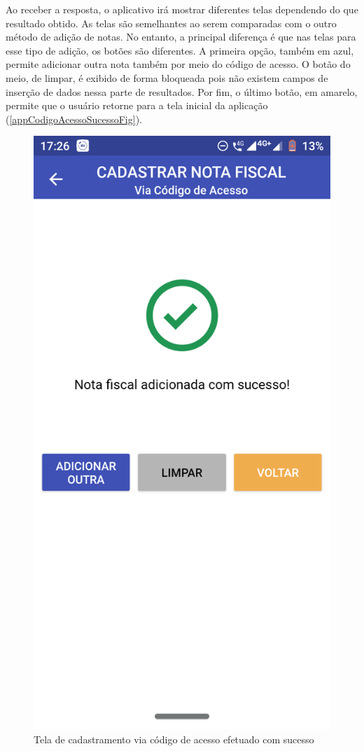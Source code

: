 Ao receber a resposta, o aplicativo irá mostrar diferentes telas dependendo do que resultado obtido. As telas são semelhantes ao serem comparadas com o outro método de adição de notas. No entanto, a principal diferença é que nas telas para esse tipo de adição, os botões são diferentes. A primeira opção, também em azul, permite adicionar outra nota também por meio do código de acesso. O botão do meio, de limpar, é exibido de forma bloqueada pois não existem campos de inserção de dados nessa parte de resultados. Por fim, o último botão, em amarelo, permite que o usuário retorne para a tela inicial da aplicação (\autoref{appCodigoAcessoSucessoFig}).

\newpage
\begin{figure}[h]
    \centering
    \caption{Tela de cadastramento via código de acesso efetuado com sucesso}
    \includegraphics[scale=0.15]{tcc/figures/app/app_codigo_acesso_sucesso.png}

\end{figure}
